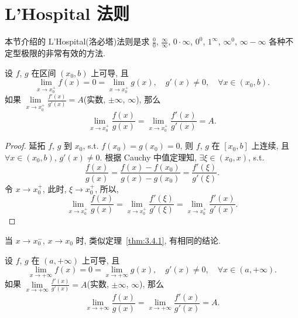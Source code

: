 \section{L'Hospital 法则}\label{sec:3.4}

本节介绍的 L'Hospital(洛必塔)法则是求 $\frac{0}{0}$, $\frac{\infty}{\infty}$, $0\cdot\infty$, $0^{0}$, $1^{\infty}$, $\infty^{0}$, $\infty-\infty$ 各种不定型极限的非常有效的方法.

\begin{theorem}\label{thm:3.4.1}
设 $f$, $g$ 在区间 $(x_0,b)$ 上可导, 且
\[
\lim_{x\to x_0^{+}}f(x)=0=\lim_{x\to x_0^{+}}g(x),\quad g'(x)\neq0,\quad \forall x\in(x_0,b).
\]
如果 $\lim\limits_{x\to x_0^{+}}\frac{f'(x)}{g'(x)}=A$(实数, $\pm\infty$, $\infty$), 那么
\[
\lim_{x\to x_0^{+}}\frac{f(x)}{g(x)}=\lim_{x\to x_0^{+}}\frac{f'(x)}{g'(x)}=A.
\]
\end{theorem}

\begin{proof}
延拓 $f$, $g$ 到 $x_0$, s.t. $f(x_0)=g(x_0)=0$, 则 $f$, $g$ 在 $[x_0,b]$ 上连续, 且 $\forall x\in(x_0,b)$, $g'(x)\neq0$. 根据 Cauchy 中值定理知, $\exists\xi\in(x_0,x)$, s.t.
\[
\frac{f(x)}{g(x)}=\frac{f(x)-f(x_0)}{g(x)-g(x_0)}=\frac{f'(\xi)}{g'(\xi)}.
\]
令 $x\to x_0^{+}$, 此时, $\xi\to x_0^{+}$, 所以,
\[
\lim_{x\to x_0^{+}}\frac{f(x)}{g(x)}=\lim_{x\to x_0^{+}}\frac{f'(\xi)}{g'(\xi)}=\lim_{x\to x_0^{+}}\frac{f'(x)}{g'(x)}.
\]
\end{proof}

\begin{remark}\label{rem:3.4.1}
当 $x\to x_0^{-}$, $x\to x_0$ 时, 类似定理~\ref{thm:3.4.1}, 有相同的结论.
\end{remark}

\begin{theoremp}\label{thm:3.4.1p}
设 $f$, $g$ 在 $(a,+\infty)$ 上可导, 且
\[
\lim_{x\to+\infty}f(x)=0=\lim_{x\to+\infty}g(x),\quad g'(x)\neq0,\quad \forall x\in(a,+\infty).
\]
如果 $\lim\limits_{x\to+\infty}\frac{f'(x)}{g'(x)}=A$(实数, $\pm\infty$, $\infty$), 那么
\[
\lim_{x\to+\infty}\frac{f(x)}{g(x)}=\lim_{x\to+\infty}\frac{f'(x)}{g'(x)}=A.
\]
\end{theoremp}

